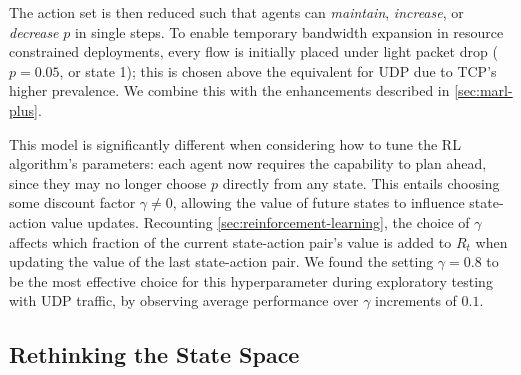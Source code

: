 \documentclass[conference, letterpaper, 10pt, times]{IEEEtran}
\begin{document}
The action set is then reduced such that agents can \emph{maintain}, \emph{increase}, or \emph{decrease} $p$ in single steps.
To enable temporary bandwidth expansion in resource constrained deployments, every flow is initially placed under light packet drop ($p=0.05$, or state 1); this is chosen above the equivalent for UDP due to TCP's higher prevalence.
We combine this with the enhancements described in \cref{sec:marl-plus}.

This model is significantly different when considering how to tune the RL algorithm's parameters: each agent now requires the capability to plan ahead, since they may no longer choose $p$ directly from any state.
This entails choosing some discount factor $\gamma \ne 0$, allowing the value of future states to influence state-action value updates.
Recounting \cref{sec:reinforcement-learning}, the choice of $\gamma$ affects which fraction of the current state-action pair's value is added to $R_t$ when updating the value of the last state-action pair.
We found the setting $\gamma = 0.8$ to be the most effective choice for this hyperparameter during exploratory testing with UDP traffic, by observing average performance over $\gamma$ increments of $0.1$.

\subsection{Rethinking the State Space}\label{sec:rethinking-the-state-space}
\end{document}
